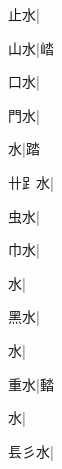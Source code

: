 \begin{multicols}{2}
{{\cjk{}{\cnsym{}　}止水}\mktsJzrVerticalBar{}{\cjk{}{\cnsym{}　}{\cnsym{}　}{\cnsym{}　}}|{}\par
{\cjk{}{\cnsym{}　}山水}\mktsJzrVerticalBar{}{\cjk{}{\cnsym{}　}{\cnsym{}　}{\cnsym{}　}}|{\cjk{}崉}\par
{\cjk{}{\cnsym{}　}口水}\mktsJzrVerticalBar{}{\cjk{}{\cnsym{}　}{\cnsym{}　}{\cnsym{}　}}|{}\par
{\cjk{}{\cnsym{}　}門水}\mktsJzrVerticalBar{}{\cjk{}{\cnsym{}　}{\cnsym{}　}{\cnsym{}　}}|{}\par
{水}\mktsJzrVerticalBar{}{\cjk{}{\cnsym{}　}{\cnsym{}　}{\cnsym{}　}}|{\cjk{}踏}\par
{\cjk{}卄{\cnxb{}𧾷}水}\mktsJzrVerticalBar{}{\cjk{}{\cnsym{}　}{\cnsym{}　}{\cnsym{}　}}|{}\par
{\cjk{}{\cnsym{}　}虫水}\mktsJzrVerticalBar{}{\cjk{}{\cnsym{}　}{\cnsym{}　}{\cnsym{}　}}|{}\par
{\cjk{}{\cnsym{}　}巾水}\mktsJzrVerticalBar{}{\cjk{}{\cnsym{}　}{\cnsym{}　}{\cnsym{}　}}|{}\par
{水}\mktsJzrVerticalBar{}{\cjk{}{\cnsym{}　}{\cnsym{}　}{\cnsym{}　}}|{}\par
{\cjk{}{\cnsym{}　}黑水}\mktsJzrVerticalBar{}{\cjk{}{\cnsym{}　}{\cnsym{}　}{\cnsym{}　}}|{}\par
{水}\mktsJzrVerticalBar{}{\cjk{}{\cnsym{}　}{\cnsym{}　}{\cnsym{}　}}|{}\par
{\cjk{}{\cnsym{}　}重水}\mktsJzrVerticalBar{}{\cjk{}{\cnsym{}　}{\cnsym{}　}{\cnsym{}　}}|{\cjk{}濌}\par
{水}\mktsJzrVerticalBar{}{\cjk{}{\cnsym{}　}{\cnsym{}　}{\cnsym{}　}}|{}\par
{\cjk{}镸彡水}\mktsJzrVerticalBar{}{\cjk{}{\cnsym{}　}{\cnsym{}　}{\cnsym{}　}}|{}\par
}
\end{multicols}
